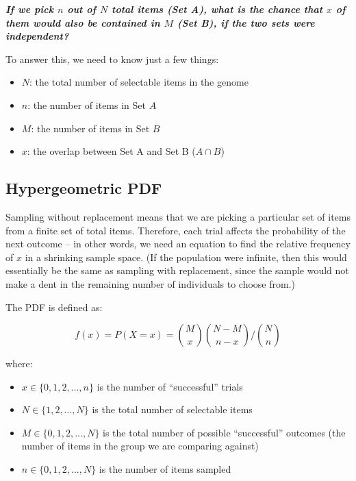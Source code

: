 \documentclass[
]{article}
\providecommand{\tightlist}{%
  \setlength{\itemsep}{0pt}\setlength{\parskip}{0pt}}
\begin{document}
\textbf{\emph{If we pick \(n\) out of \(N\) total items (Set A), what is
the chance that \(x\) of them would also be contained in \(M\) (Set B),
if the two sets were independent?}}

To answer this, we need to know just a few things:

\begin{itemize}
\tightlist
\item
  \(N\): the total number of selectable items in the genome
\item
  \(n\): the number of items in Set \(A\)
\item
  \(M\): the number of items in Set \(B\)
\item
  \(x\): the overlap between Set A and Set B (\(A \cap B\))
\end{itemize}

\hypertarget{hypergeometric-pdf}{%
\subsection{Hypergeometric PDF}\label{hypergeometric-pdf}}

Sampling without replacement means that we are picking a particular set
of items from a finite set of total items. Therefore, each trial affects
the probability of the next outcome -- in other words, we need an
equation to find the relative frequency of \(x\) in a shrinking sample
space. (If the population were infinite, then this would essentially be
the same as sampling with replacement, since the sample would not make a
dent in the remaining number of individuals to choose from.)

The PDF is defined as:

\[ f(x) = P(X = x) = {M \choose x}{N - M \choose n - x}\bigg/{N \choose n} \]

where:

\begin{itemize}
\tightlist
\item
  \(x \in \{0,1,2,...,n\}\) is the number of ``successful'' trials
\item
  \(N \in \{1,2,...,N\}\) is the total number of selectable items
\item
  \(M \in \{0,1,2,...,N\}\) is the total number of possible
  ``successful'' outcomes (the number of items in the group we are
  comparing against)
\item
  \(n \in \{0,1,2,...,N\}\) is the number of items sampled
\end{itemize}
\end{document}
